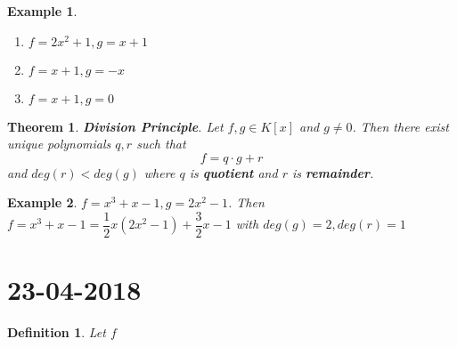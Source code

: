 \documentclass[a4paper,10pt]{article}
\newtheorem{theo}{Theorem}
\newtheorem{defi}{Definition}
\newtheorem{ex}{Example}
\begin{document}
\begin{ex}
	\begin{enumerate}
		\item $ f=2x^2 +1 , g =x+1 $
		\item  $ f=x+1, g=-x $
		\item  $ f=x+1, g =0 $
	\end{enumerate}
\end{ex}

\begin{theo}
	\textbf{Division Principle}. Let $ f,g \in K[x] $ and $ g \neq 0 $. Then there exist unique polynomials $ q,r $ such that
	\[ f= q \cdot g + r  \] and $ deg(r) < deg(g) $ where $ q $ is \textbf{quotient} and $ r $ is \textbf{remainder}.
\end{theo}

\begin{ex}
	$ f = x^3 +x -1 , g =2x^2 -1 $. Then $ f = x^3+x-1 = \dfrac{1}{2} x (2x^2-1) + \dfrac{3}{2}x -1 $ with $ deg(g)=2 , deg(r)=1 $
\end{ex}

\newpage
\section{23-04-2018}

\begin{defi}
	Let $ f $
\end{defi}
\end{document}
